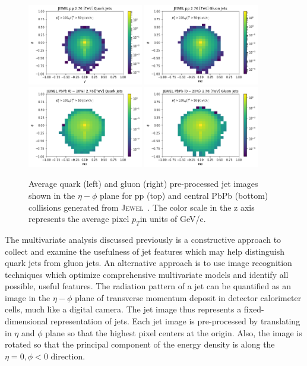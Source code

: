 \documentclass[notoc]{JHEP3}
\newcommand{\pt}{$p_{T}$}
\newcommand{\jw}{\textsc{Jewel}~}
\begin{document}
\begin{figure}[t]
\centering
\includegraphics[width=0.45\textwidth]{plots/jewel_pp_avgQuarkJet}
\includegraphics[width=0.45\textwidth]{plots/jewel_pp_avgGluonJet}
\includegraphics[width=0.45\textwidth]{plots/jewel_pbpb020_avgQuarkJet}
\includegraphics[width=0.45\textwidth]{plots/jewel_pbpb020_avgGluonJet}
\caption{Average quark (left) and gluon (right) pre-processed jet images shown in the $\eta-\phi$ plane for pp (top) and central PbPb (bottom) collisions generated from \jw. The color scale in the z axis represents the average pixel \pt in units of GeV/c. }
\label{fig:qgjetimages}
\end{figure}

The multivariate analysis discussed previously is a constructive approach to collect and examine the usefulness of jet features which may help distinguish quark jets from gluon jets. An alternative approach is to use image recognition techniques which optimize comprehensive multivariate models and identify all possible, useful features. The radiation pattern of a jet can be quantified as an image in the $\eta-\phi$ plane of transverse momentum deposit in detector calorimeter cells, much like a digital camera. The jet image thus represents a fixed-dimensional representation of jets. Each jet image is pre-processed \cite{deOliveira:2015xxd} by translating in $\eta$ and $\phi$ plane so that the highest pixel centers at the origin. Also, the image is rotated so that the principal component of the energy density is along the $\eta=0, \phi<0$ direction. 
 
\end{document}
